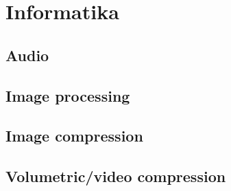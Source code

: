 \section{Informatika}
    
    \subsection{Audio}
    \subsection{Image processing}
    \subsection{Image compression}
    \subsection{Volumetric/video compression}
     
    
